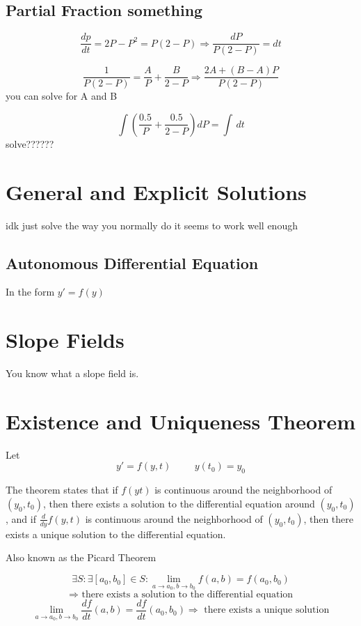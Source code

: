 \documentclass[fleqn]{report}
\newcommand{\hp}{\hspace{1cm}}
\begin{document}
\subsection{Partial Fraction something}
\[
\frac{dp}{dt} = 2P - P^2 = P(2 - P)
\Rightarrow
\frac{dP}{P(2 - P)} = dt
\]

\[
\frac{1}{P(2 - P)} = \frac{A}{P} + \frac{B}{2 - P}
\Rightarrow
\frac{2A + (B - A)P}{P(2 - P)}
\]
you can solve for A and B

\[
\int \left( \frac{0.5}{P} + \frac{0.5}{2 - P} \right) dP = \int \,dt
\]
solve??????


\section{General and Explicit Solutions}

idk just solve the way you normally do it seems to work well enough

\subsection{Autonomous Differential Equation}
In the form $y' = f(y)$



\section{Slope Fields}
You know what a slope field is.


\section{Existence and Uniqueness Theorem}
Let 
\[
y' = f(y, t) 
\hp
y(t_0) = y_0
\]

The theorem states that if $f(y t)$ is continuous around the neighborhood of $(y_0, t_0)$, then there exists a solution to the differential equation around $(y_0, t_0)$, and if $\frac{d}{dy}f(y, t)$ is continuous around the neighborhood of $(y_0, t_0)$, then there exists a unique solution to the differential equation.

Also known as the Picard Theorem

\[
\exists S:
\exists [a_0, b_0] \in S: \lim_{a \to a_0, b \to b_0} f(a, b) = f(a_0, b_0)
\]
\[
\Longrightarrow
\textrm{ there exists a solution to the differential equation}
\]
\[
\lim_{a \to a_0, b \to b_0} \frac{df}{dt}(a, b) = \frac{df}{dt}(a_0, b_0)
\Longrightarrow
\textrm{ there exists a unique solution}
\]
\end{document}
